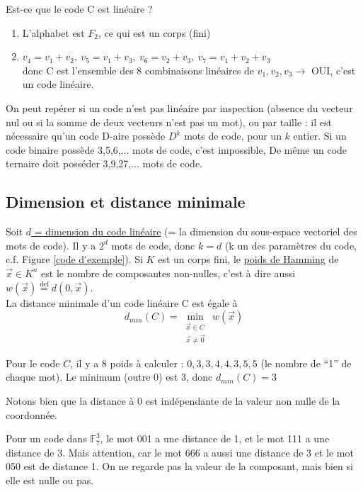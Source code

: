 \documentclass[11pt,a4paper]{article}
\renewcommand{\)}{\right)}
\renewcommand{\(}{\left(}
\newcommand{\F}{\ensuremath{\mathbb{F}}}
\begin{document}
\begin{exemple}[0.75]
	Est-ce que le code C est linéaire ?
	\begin{enumerate}
		\item 	L'alphabet est $F_2$, ce qui est un corps (fini)
		\item 	$v_4 = v_1 + v_2,\ v_5 = v_1+v_3,\ v_6 = v_2+v_3,\ v_7 = v_1+v_2+v_3$\\
				donc C est l'ensemble des 8 combinaisons linéaires de $v_1,v_2,v_3 \to$ OUI, c'est un code linéaire.
	\end{enumerate}
	On peut repérer si un code n'est pas linéaire par inspection (absence du vecteur nul ou si la somme de deux vecteurs n'est pas un mot), ou par taille : il est nécessaire qu'un code D-aire possède $D^k$ mots de code, pour un $k$ entier. Si un code binaire possède 3,5,6,... mots de code, c'est impossible, De même un code ternaire doit posséder 3,9,27,... mots de code.
\end{exemple}
\subsection{Dimension et distance minimale}
Soit \uline{$d$ = dimension du code linéaire} (= la dimension du sous-espace vectoriel des mots de code). Il y a $2^d$ mots de code, donc $k=d$ (k un des paramètres du code, c.f. Figure \ref{code d'exemple}).
 Si $K$ est un corps fini, le \uline{poids de Hamming} de $\vec{x} \in K^n$ est le nombre de composantes non-nulles, c'est à dire aussi $w(\vec{x}) \overset{\text{def}}{=} d(0,\vec{x})$.\\
La distance minimale d'un code linéaire C est égale à \[d_{min}(C) = \underset{\substack{\vec{x} \in C \\ \vec{x}\neq \vec{0}}}{\min}\, w(\vec{x})\]
\begin{exemple}
	Pour le code $C$, il y a 8 poids à calculer : $0,3,3,4,4,3,5,5$ (le nombre de \enquote{1} de chaque mot). Le minimum (outre 0) est 3, donc $d_{min}(C) = 3$
\end{exemple}
Notons bien que la distance à 0 est indépendante de la valeur non nulle de la coordonnée.
\begin{exemple}
	Pour un code dans $\F_7^3$, le mot 001 a une distance de 1, et le mot 111 a une distance de 3. Mais attention, car le mot 666 a aussi une distance de 3 et le mot 050 est de distance 1. On ne regarde pas la valeur de la composant, mais bien si elle est nulle ou pas.
\end{exemple}
\end{document}
